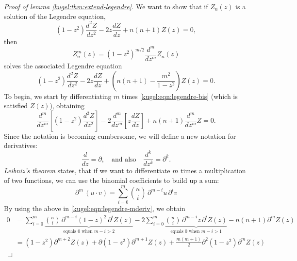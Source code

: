 \begin{proof}[Proof of lemma \ref{kugel:thm:extend-legendre}]
  We want to show that if $Z_n(z)$ is a solution of the Legendre equation,
  \begin{equation} \label{kugel:eqn:legendre-bis}
    (1 - z^2)\frac{d^2 Z}{dz^2}
    - 2z\frac{d Z}{dz}
    + n(n + 1) Z(z) = 0,
  \end{equation}
  then
  \begin{equation*}
    Z^m_n(z) = (1 - z^2)^{m/2} \frac{d^m}{dz^m}Z_n(z)
  \end{equation*}
  solves the associated Legendre equation 
  \begin{equation*}
    (1 - z^2)\frac{d^2 Z}{dz^2}
    - 2z\frac{d Z}{dz}
    + \left( n(n + 1) - \frac{m^2}{1 - z^2} \right) Z(z) = 0.
  \end{equation*}
  To begin, we start by differentiating $m$ times \eqref{kugel:eqn:legendre-bis}
  (which is satisfied $Z(z)$), obtaining
  \begin{equation} \label{kugel:eqn:legendre-mderiv}
    \frac{d^m}{dz^m}\left[
      (1-z^2)\frac{d^2Z}{dz^2}
    \right]
    -2 \frac{d^m}{dz^m}\left[ z\frac{dZ}{dz} \right]
    + n(n+1)\frac{d^m}{dz^m}Z = 0.
  \end{equation}
  Since the notation is becoming cumbersome, we will define a new notation for
  derivatives:
  \begin{equation*}
    \frac{d}{dz} = \partial, \quad \text{and also} \quad
    \frac{d^k}{dz^k} = \partial^k.
  \end{equation*}
  \emph{Leibniz's theorem} states, that if we want to differentiate $m$ times a
  multiplication of two functions, we can use the binomial coefficients to build
  up a sum:
  \begin{equation*} %
    \partial^m \, (u \cdot v)
      = \sum_{i=0}^m \binom{n}{i} \, \partial^{m-i} u \, \partial^i v
  \end{equation*}
  By using the above in \eqref{kugel:eqn:legendre-mderiv}, we obtain
  \begin{align}
    0 &= \sum_{i=0}^m \underbrace{
      \binom{n}{i} \, \partial^{m-i} (1-z)^2 \, \partial^i Z(z)
    }_{\text{equals 0 when } m-i > 2}
    - 2 \sum_{i=0}^m \underbrace{
      \binom{n}{i} \, \partial^{m-i} z \, \partial^i Z(z)
    }_{\text{equals 0 when } m-i > 1}
    - n(n+1) \partial^m Z(z)
    \nonumber \\
    &= (1-z^2) \partial^{m+2} Z(z)
    + \partial (1-z^2) \partial^{m+1} Z(z)
    + \frac{m(m+1)}{2} \partial^2 (1-z^2) \partial^m Z(z)

\end{align}
\end{proof}

